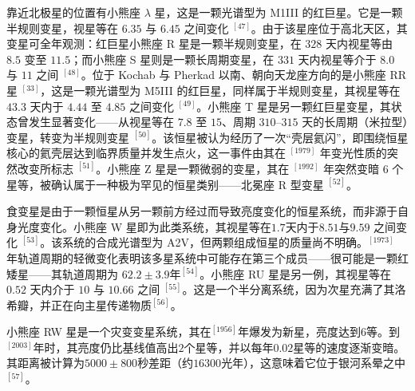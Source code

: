 靠近北极星的位置有小熊座 $\lambda$ 星，这是一颗光谱型为 M1III 的红巨星。它是一颗半规则变星，视星等在 $6.35$ 与 $6.45$ 之间变化 $^{[47]}$。由于该星座位于高北天区，其变星可全年观测：红巨星小熊座 R 星是一颗半规则变星，在 $328$ 天内视星等由 $8.5$ 变至 $11.5$；而小熊座 S 星则是一颗长周期变星，在 $331$ 天内视星等介于 $8.0$ 与 $11$ 之间 $^{[48]}$。位于 Kochab 与 Pherkad 以南、朝向天龙座方向的是小熊座 RR 星 $^{[33]}$，这是一颗光谱型为 M5III 的红巨星，同样属于半规则变星，其视星等在 $43.3$ 天内于 $4.44$ 至 $4.85$ 之间变化 $^{[49]}$。小熊座 T 星是另一颗红巨星变星，其状态曾发生显著变化——从视星等在 $7.8$ 至 $15$、周期 $310$--$315$ 天的长周期（米拉型）变星，转变为半规则变星 $^{[50]}$。该恒星被认为经历了一次“壳层氦闪”，即围绕恒星核心的氦壳层达到临界质量并发生点火，这一事件由其在 $^{[1979]}$ 年变光性质的突然改变所标志 $^{[51]}$。小熊座 Z 星是一颗微弱的变星，其在 $^{[1992]}$ 年突然变暗 $6$ 个星等，被确认属于一种极为罕见的恒星类别——北冕座 R 型变星 $^{[52]}$。

食变星是由于一颗恒星从另一颗前方经过而导致亮度变化的恒星系统，而非源于自身光度变化。小熊座 W 星即为此类系统，其视星等在$1.7$天内于$8.51$与$9.59$ 之间变化 $^{[53]}$。该系统的合成光谱型为 A2V，但两颗组成恒星的质量尚不明确。$^{[1973]}$ 年轨道周期的轻微变化表明该多星系统中可能存在第三个成员——很可能是一颗红矮星——其轨道周期为 $62.2\pm3.9$年$^{[54]}$。小熊座 RU 星是另一例，其视星等在 $0.52$ 天内介于 $10$ 与 $10.66$ 之间 $^{[55]}$。这是一个半分离系统，因为次星充满了其洛希瓣，并正在向主星传递物质$^{[56]}$。

小熊座 RW 星是一个灾变变星系统，其在$^{[1956]}$年爆发为新星，亮度达到$6$等。到$^{[2003]}$年时，其亮度仍比基线值高出$2$个星等，并以每年$0.02$星等的速度逐渐变暗。其距离被计算为$5000\pm800$秒差距（约$16300$光年），这意味着它位于银河系晕之中$^{[57]}$。
